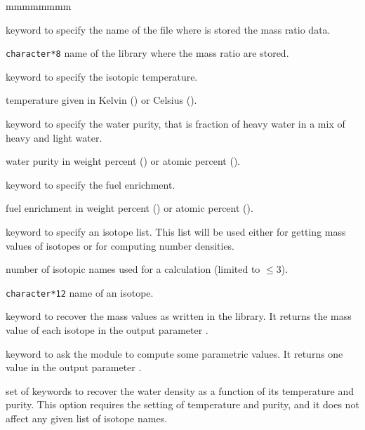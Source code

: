 \begin{ListeDeDescription}{mmmmmmmm}
\item[\moc{FIL:}] keyword to specify the name of the file where is  stored the mass
ratio data. 

\item[\dusa{NAMEFIL}] \verb|character*8| name of the library where the mass ratio
are stored.

\item[\moc{TMP:}] keyword to specify the isotopic temperature.

\item[\dusa{temp}] temperature given in Kelvin () or Celsius ().

\item[\moc{PUR:}] keyword to specify the water purity, that is fraction of heavy
water in a mix of heavy and light water.

\item[\dusa{purity}] water purity in weight percent () or atomic percent
().

\item[\moc{ENR:}] keyword to specify the fuel enrichment.

\item[\dusa{enrichment}] fuel enrichment in weight percent () or atomic
percent ().

\item[\moc{ISO:}] keyword to specify an isotope list. This list will be used either
for getting mass values of isotopes or for computing number  densities.

\item[\dusa{nbiso}] number of isotopic names used for a calculation (limited to
$\leq 3$).

\item[\dusa{ISONAM}] \verb|character*12| name of an isotope.

\item[\moc{GET MASS}] keyword to recover the mass values as written in the library.
It returns the mass value of each isotope in the output parameter . 

\item[\moc{CALC}] keyword to ask the module to compute some parametric values. It
returns one value in the output parameter . 

\item[\moc{DENS} \moc{WATER}] set of keywords to recover the water density as a
function of its temperature and purity. This option requires the setting of
temperature and purity, and it does not affect any given list of isotope names. 


\end{ListeDeDescription}
